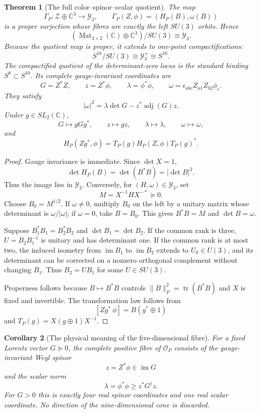 \documentclass[11pt]{article}
\newtheorem{theorem}{Theorem}[section]
\newtheorem{corollary}[theorem]{Corollary}
\theoremstyle{definition}
\newcommand{\C}{\mathbb C}
\newcommand{\Mat}{\operatorname{Mat}}
\newcommand{\tr}{\operatorname{tr}}
\newcommand{\im}{\operatorname{im}}
\newcommand{\adj}{\operatorname{adj}}
\newcommand{\Y}{\mathcal Y_3}
\newcommand{\cZ}{\mathscr Z}
\begin{document}
\begin{theorem}[The full color--spinor--scalar quotient]\label{thm:color-quotient}
The map
\[
 \Gamma_P:\cZ\oplus\C^3\longrightarrow\Y,
 \qquad
 \Gamma_P(Z,\phi)=(H_P(B),\omega(B))
\]
is a proper surjection whose fibres are exactly the left $SU(3)$ orbits.  Hence
\[
 \boxed{(\Mat_{3\times2}(\C)\oplus\C^3)/SU(3)\cong\Y.}
\]
Because the quotient map is proper, it extends to one-point compactifications:
\[
 \boxed{
 S^{18}/SU(3)\cong\Y^+\cong S^{10}.}
\]
The compactified quotient of the determinant-zero locus is the standard
binding $S^8\subset S^{10}$.
Its complete gauge-invariant coordinates are
\[
 \boxed{
 G=Z^*Z,\qquad z=Z^*\phi,
 \qquad\lambda=\phi^*\phi,
 \qquad\omega=\epsilon_{abc}Z_{a1}Z_{b2}\phi_c.}
\]
They satisfy
\[
 \boxed{
 |\omega|^2=\lambda\det G-z^*\adj(G)z.}
\]
Under $g\in SL_2(\C)$,
\[
 G\mapsto gGg^*,\qquad z\mapsto gz,
 \qquad\lambda\mapsto\lambda,
 \qquad\omega\mapsto\omega,
\]
and
\[
 H_P(Zg^*,\phi)=T_P(g)H_P(Z,\phi)T_P(g)^*.
\]
\end{theorem}

\begin{proof}
Gauge invariance is immediate.  Since $\det X=1$,
\[
 \det H_P(B)=\det(B^*B)=|\det B|^2.
\]
Thus the image lies in $\Y$.  Conversely, for $(H,\omega)\in\Y$, set
\[
 M=X^{-1}HX^{-*}\succeq0.
\]
Choose $B_0=M^{1/2}$.  If $\omega\neq0$, multiply $B_0$ on the left by a unitary matrix whose determinant is $\omega/|\omega|$; if $\omega=0$, take $B=B_0$.  This gives $B^*B=M$ and $\det B=\omega$.

Suppose $B_1^*B_1=B_2^*B_2$ and $\det B_1=\det B_2$.  If the common rank is three, $U=B_2B_1^{-1}$ is unitary and has determinant one.  If the common rank is at most two, the induced isometry from $\im B_1$ to $\im B_2$ extends to $U_0\in U(3)$, and its determinant can be corrected on a nonzero orthogonal complement without changing $B_1$.  Thus $B_2=UB_1$ for some $U\in SU(3)$.

Properness follows because $B\mapsto B^*B$ controls $\|B\|_F^2=\tr(B^*B)$ and $X$ is fixed and invertible.  The transformation law follows from
\[
 [Zg^*\ \phi]=B(g^*\oplus1)
\]
and $T_P(g)=X(g\oplus1)X^{-1}$.
\end{proof}

\begin{corollary}[The physical meaning of the five-dimensional fibre]\label{cor:fibre-meaning}
For a fixed Lorentz vector $G\succeq0$, the complete positive fibre of $\mathcal O_P$ consists of the gauge-invariant Weyl spinor
\[
 z=Z^*\phi\in\im G
\]
and the scalar norm
\[
 \lambda=\phi^*\phi\geq z^*G^\dagger z.
\]
For $G>0$ this is exactly four real spinor coordinates and one real scalar coordinate.  No direction of the nine-dimensional cone is discarded.
\end{corollary}
\end{document}

